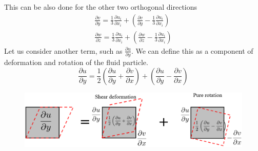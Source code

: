\documentclass[class=report, crop=false, 12pt,a4paper]{standalone}
\begin{document}
This can be also done for the other two orthogonal directions
\begin{gather}
  \frac{\partial v}{\partial y} = \frac{1}{3}\frac{\partial u_i}{\partial x_i} + \left( \frac{\partial v}{\partial y} - \frac{1}{3}\frac{\partial u_i}{\partial x_i} \right)\\
  \frac{\partial w}{\partial z} = \frac{1}{3}\frac{\partial u_i}{\partial x_i} + \left( \frac{\partial w}{\partial z} - \frac{1}{3}\frac{\partial u_i}{\partial x_i} \right)
\end{gather}
Let us consider another term, such as $\frac{\partial u}{\partial y}$. We can define this as a component of deformation and rotation of the fluid particle.
\begin{equation}
  \frac{\partial u}{\partial y}=\frac{1}{2} \left(\frac{\partial u}{\partial y} + \frac{\partial v}{\partial x}\right) + \left(\frac{\partial u}{\partial y} - \frac{\partial v}{\partial x}\right)
\end{equation}
\begin{figure}[H]
  \centering
  \includegraphics[width = \textwidth]{../img/diagram5.png}
\end{figure}
\end{document}
